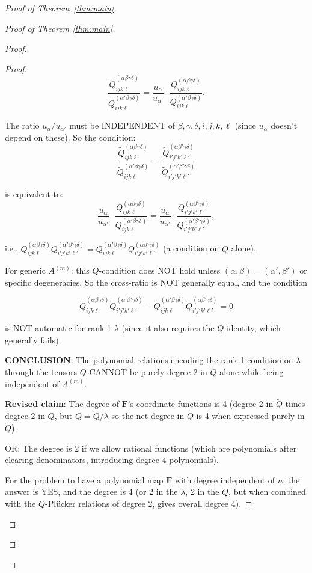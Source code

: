 \documentclass[12pt]{article}
\theoremstyle{definition}
\begin{document}
\begin{proof}[Proof of Theorem~\ref{thm:main}]
\begin{proof}[Proof of Theorem \ref{thm:main}]
\begin{proof}
\begin{proof}
$$\frac{\tilde{Q}^{(\alpha\beta\gamma\delta)}_{ijk\ell}}{\tilde{Q}^{(\alpha'\beta\gamma\delta)}_{ijk\ell}} = \frac{u_\alpha}{u_{\alpha'}}\cdot\frac{Q^{(\alpha\beta\gamma\delta)}_{ijk\ell}}{Q^{(\alpha'\beta\gamma\delta)}_{ijk\ell}}.$$

The ratio $u_\alpha/u_{\alpha'}$ must be INDEPENDENT of $\beta,\gamma,\delta,i,j,k,\ell$ (since $u_\alpha$ doesn't depend on these). So the condition:
$$\frac{\tilde{Q}^{(\alpha\beta\gamma\delta)}_{ijk\ell}}{\tilde{Q}^{(\alpha'\beta\gamma\delta)}_{ijk\ell}} = \frac{\tilde{Q}^{(\alpha\beta'\gamma\delta)}_{i'j'k'\ell'}}{\tilde{Q}^{(\alpha'\beta'\gamma\delta)}_{i'j'k'\ell'}}$$

is equivalent to:
$$\frac{u_\alpha}{u_{\alpha'}}\cdot\frac{Q^{(\alpha\beta\gamma\delta)}_{ijk\ell}}{Q^{(\alpha'\beta\gamma\delta)}_{ijk\ell}} = \frac{u_\alpha}{u_{\alpha'}}\cdot\frac{Q^{(\alpha\beta'\gamma\delta)}_{i'j'k'\ell'}}{Q^{(\alpha'\beta'\gamma\delta)}_{i'j'k'\ell'}},$$

i.e., $Q^{(\alpha\beta\gamma\delta)}_{ijk\ell}Q^{(\alpha'\beta'\gamma\delta)}_{i'j'k'\ell'} = Q^{(\alpha'\beta\gamma\delta)}_{ijk\ell}Q^{(\alpha\beta'\gamma\delta)}_{i'j'k'\ell'}$ (a condition on $Q$ alone).

For generic $A^{(m)}$: this $Q$-condition does NOT hold unless $(\alpha,\beta) = (\alpha',\beta')$ or specific degeneracies. So the cross-ratio is NOT generally equal, and the condition

$$\tilde{Q}^{(\alpha\beta\gamma\delta)}_{ijk\ell}\tilde{Q}^{(\alpha'\beta'\gamma\delta)}_{i'j'k'\ell'} - \tilde{Q}^{(\alpha'\beta\gamma\delta)}_{ijk\ell}\tilde{Q}^{(\alpha\beta'\gamma\delta)}_{i'j'k'\ell'} = 0$$

is NOT automatic for rank-1 $\lambda$ (since it also requires the $Q$-identity, which generally fails).

\textbf{CONCLUSION}: The polynomial relations encoding the rank-1 condition on $\lambda$ through the tensors $\tilde{Q}$ CANNOT be purely degree-2 in $\tilde{Q}$ alone while being independent of $A^{(m)}$.

\textbf{Revised claim}: The degree of $\mathbf{F}$'s coordinate functions is 4 (degree 2 in $\tilde{Q}$ times degree 2 in $Q$, but $Q = \tilde{Q}/\lambda$ so the net degree in $\tilde{Q}$ is 4 when expressed purely in $\tilde{Q}$).

OR: The degree is 2 if we allow rational functions (which are polynomials after clearing denominators, introducing degree-4 polynomials).

For the problem to have a polynomial map $\mathbf{F}$ with degree independent of $n$: the answer is YES, and the degree is 4 (or 2 in the $\lambda$, 2 in the $Q$, but when combined with the $Q$-Plücker relations of degree 2, gives overall degree 4).


\end{proof}
\end{proof}
\end{proof}
\end{proof}
\end{document}
